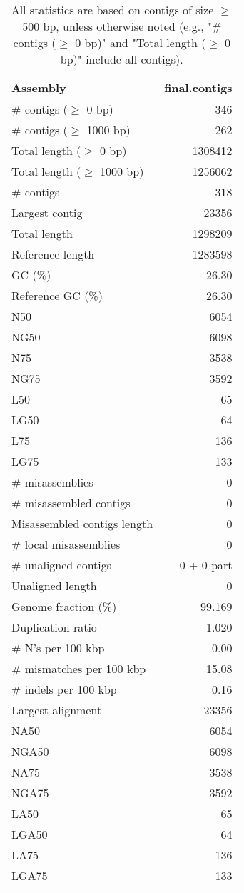 \documentclass[12pt,a4paper]{article}
\begin{document}
\begin{table}[ht]
\begin{center}
\caption{All statistics are based on contigs of size $\geq$ 500 bp, unless otherwise noted (e.g., "\# contigs ($\geq$ 0 bp)" and "Total length ($\geq$ 0 bp)" include all contigs).}
\begin{tabular}{|l*{1}{|r}|}
\hline
Assembly & final.contigs \\ \hline
\# contigs ($\geq$ 0 bp) & 346 \\ \hline
\# contigs ($\geq$ 1000 bp) & 262 \\ \hline
Total length ($\geq$ 0 bp) & 1308412 \\ \hline
Total length ($\geq$ 1000 bp) & 1256062 \\ \hline
\# contigs & 318 \\ \hline
Largest contig & 23356 \\ \hline
Total length & 1298209 \\ \hline
Reference length & 1283598 \\ \hline
GC (\%) & 26.30 \\ \hline
Reference GC (\%) & 26.30 \\ \hline
N50 & 6054 \\ \hline
NG50 & 6098 \\ \hline
N75 & 3538 \\ \hline
NG75 & 3592 \\ \hline
L50 & 65 \\ \hline
LG50 & 64 \\ \hline
L75 & 136 \\ \hline
LG75 & 133 \\ \hline
\# misassemblies & 0 \\ \hline
\# misassembled contigs & 0 \\ \hline
Misassembled contigs length & 0 \\ \hline
\# local misassemblies & 0 \\ \hline
\# unaligned contigs & 0 + 0 part \\ \hline
Unaligned length & 0 \\ \hline
Genome fraction (\%) & 99.169 \\ \hline
Duplication ratio & 1.020 \\ \hline
\# N's per 100 kbp & 0.00 \\ \hline
\# mismatches per 100 kbp & 15.08 \\ \hline
\# indels per 100 kbp & 0.16 \\ \hline
Largest alignment & 23356 \\ \hline
NA50 & 6054 \\ \hline
NGA50 & 6098 \\ \hline
NA75 & 3538 \\ \hline
NGA75 & 3592 \\ \hline
LA50 & 65 \\ \hline
LGA50 & 64 \\ \hline
LA75 & 136 \\ \hline
LGA75 & 133 \\ \hline
\end{tabular}
\end{center}
\end{table}
\end{document}
